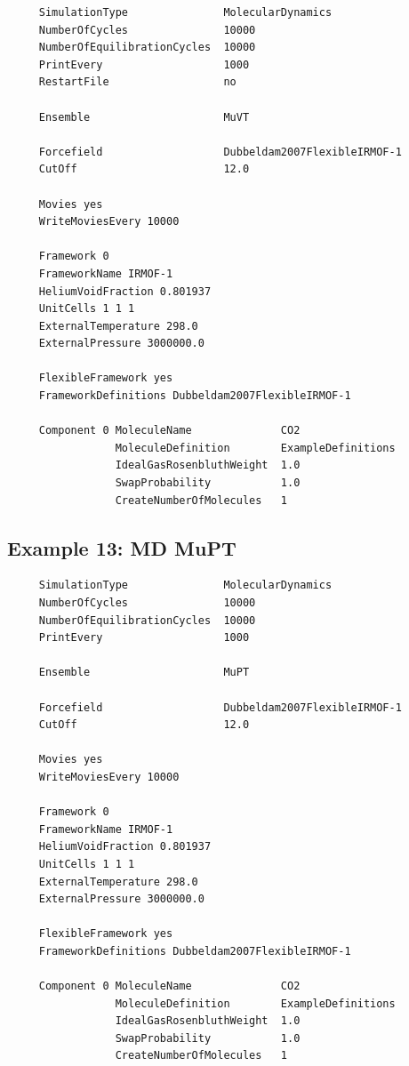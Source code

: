 \begin{tiny}
\begin{verbatim}
     SimulationType               MolecularDynamics
     NumberOfCycles               10000
     NumberOfEquilibrationCycles  10000
     PrintEvery                   1000
     RestartFile                  no
     
     Ensemble                     MuVT
     
     Forcefield                   Dubbeldam2007FlexibleIRMOF-1
     CutOff                       12.0
     
     Movies yes
     WriteMoviesEvery 10000
     
     Framework 0
     FrameworkName IRMOF-1
     HeliumVoidFraction 0.801937
     UnitCells 1 1 1
     ExternalTemperature 298.0
     ExternalPressure 3000000.0
     
     FlexibleFramework yes
     FrameworkDefinitions Dubbeldam2007FlexibleIRMOF-1
     
     Component 0 MoleculeName              CO2
                 MoleculeDefinition        ExampleDefinitions
                 IdealGasRosenbluthWeight  1.0
                 SwapProbability           1.0
                 CreateNumberOfMolecules   1
\end{verbatim}
\end{tiny}

\subsection*{Example 13: MD MuPT}

\begin{tiny}
\begin{verbatim}
     SimulationType               MolecularDynamics
     NumberOfCycles               10000
     NumberOfEquilibrationCycles  10000
     PrintEvery                   1000
     
     Ensemble                     MuPT
     
     Forcefield                   Dubbeldam2007FlexibleIRMOF-1
     CutOff                       12.0
     
     Movies yes
     WriteMoviesEvery 10000
     
     Framework 0
     FrameworkName IRMOF-1
     HeliumVoidFraction 0.801937
     UnitCells 1 1 1
     ExternalTemperature 298.0
     ExternalPressure 3000000.0
     
     FlexibleFramework yes
     FrameworkDefinitions Dubbeldam2007FlexibleIRMOF-1
     
     Component 0 MoleculeName              CO2
                 MoleculeDefinition        ExampleDefinitions
                 IdealGasRosenbluthWeight  1.0
                 SwapProbability           1.0
                 CreateNumberOfMolecules   1
\end{verbatim}
\end{tiny}

